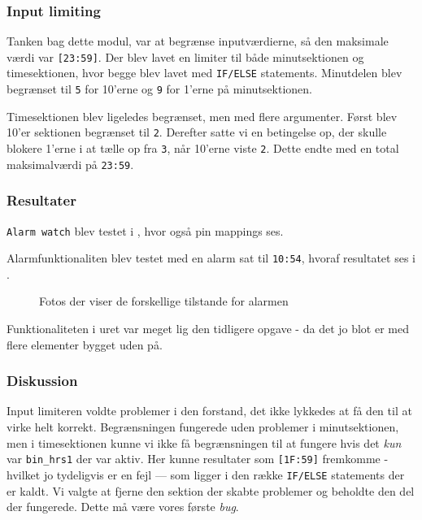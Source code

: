 {\subsubsection*{Input limiting}
Tanken bag dette modul, var at begrænse inputværdierne, så den maksimale værdi var \texttt{[23:59]}. 
Der blev lavet en limiter til både minutsektionen og timesektionen, hvor begge blev lavet med \texttt{IF/ELSE} statements. Minutdelen blev begrænset til \texttt{5} for 10'erne og \texttt{9} for 1'erne på minutsektionen.

Timesektionen blev ligeledes begrænset, men med flere argumenter. Først blev 10'er sektionen begrænset til \texttt{2}. Derefter satte vi en betingelse op, der skulle blokere 1'erne i at tælle op fra \texttt{3}, når 10'erne viste \texttt{2}.
Dette endte med en total maksimalværdi på \texttt{23:59}.

\subsubsection{Resultater}

\texttt{Alarm watch} blev testet i , hvor også pin mappings ses. 

Alarmfunktionaliten blev testet med en alarm sat til \texttt{10:54}, hvoraf resultatet ses i .
\begin{figure}[H]
    \centering
    \caption{Fotos der viser de forskellige tilstande for alarmen}\label{fig:ex6-4-fotos}
\end{figure}

Funktionaliteten i uret var meget lig den tidligere opgave - da det jo blot er   med flere elementer bygget uden på.

\subsubsection{Diskussion}
Input limiteren voldte problemer i den forstand, det ikke lykkedes at få den til at virke helt korrekt. Begrænsningen fungerede uden problemer i minutsektionen, men i timesektionen kunne vi ikke få begrænsningen til at fungere hvis det \emph{kun} var \texttt{bin\_hrs1} der var aktiv. Her kunne resultater som \texttt{[1F:59]} fremkomme - hvilket jo tydeligvis er en fejl --- som ligger i den række \texttt{IF/ELSE} statements der er kaldt. Vi valgte at fjerne den sektion der skabte problemer og beholdte den del der fungerede. Dette må være vores første \emph{bug}. 

}
